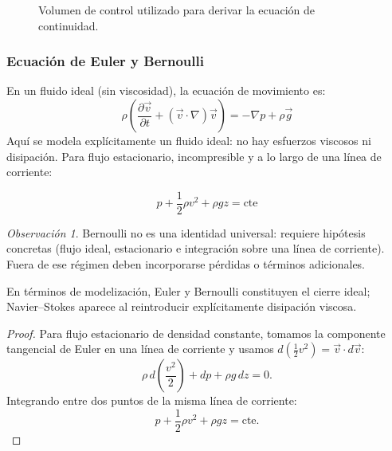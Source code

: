 \documentclass[12pt, a4paper]{article}
\theoremstyle{plain}
\theoremstyle{definition}
\theoremstyle{remark}
\newtheorem*{observacion}{Observación}
\newcommand{\ve}[1]{\vec{#1}}
\begin{document}
\begin{figure}[H]
  \centering
  \caption{Volumen de control utilizado para derivar la ecuación de continuidad.}
\end{figure}
\subsubsection{Ecuación de Euler y Bernoulli}

En un fluido ideal (sin viscosidad), la ecuación de movimiento es:
\begin{equation}
  \rho\left(\frac{\partial \ve{v}}{\partial t}+(\ve{v}\cdot\nabla)\ve{v}\right)
  = -\nabla p + \rho\ve{g}
\end{equation}
Aquí se modela explícitamente un fluido ideal: no hay esfuerzos viscosos ni disipación.
Para flujo estacionario, incompresible y a lo largo de una línea de corriente:
\begin{mdframed}[style=resultado]
\begin{equation}
  p + \frac{1}{2}\rho v^2 + \rho g z = \text{cte}
\end{equation}
\end{mdframed}
\begin{observacion}
Bernoulli no es una identidad universal: requiere hipótesis concretas (flujo ideal,
estacionario e integración sobre una línea de corriente). Fuera de ese régimen deben
incorporarse pérdidas o términos adicionales.
\end{observacion}
En términos de modelización, Euler y Bernoulli constituyen el cierre ideal; Navier--Stokes
aparece al reintroducir explícitamente disipación viscosa.

\begin{proof}
Para flujo estacionario de densidad constante, tomamos la componente tangencial de Euler en
una línea de corriente y usamos
$d(\tfrac12 v^2)=\ve{v}\cdot d\ve{v}$:
\begin{equation}
  \rho\,d\!\left(\frac{v^2}{2}\right)+dp+\rho g\,dz=0.
\end{equation}
Integrando entre dos puntos de la misma línea de corriente:
\begin{equation}
  p+\frac12\rho v^2+\rho gz=\text{cte}.
\end{equation}
\end{proof}
\end{document}
